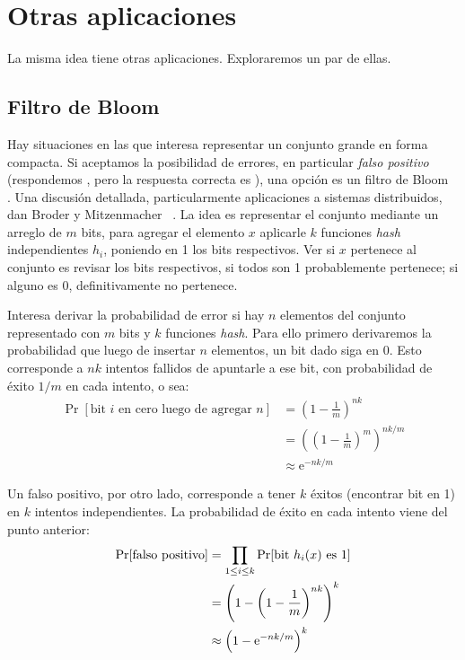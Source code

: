 
\section{Otras aplicaciones}
\label{sec:otras-aplicaciones}

  La misma idea tiene otras aplicaciones.
  Exploraremos un par de ellas.

\subsection{Filtro de Bloom}
\label{sec:filtro-de-bloom}

  Hay situaciones en las que interesa
  representar un conjunto grande en forma compacta.
  Si aceptamos la posibilidad de errores,
  en particular \emph{falso positivo}
  (respondemos ,
   pero la respuesta correcta es ),
  una opción es un filtro de Bloom~%
   \cite{bloom70:_space_time_trade_hash_codin_allow_error}.
  Una discusión detallada,
  particularmente aplicaciones a sistemas distribuidos,
  dan Broder y Mitzenmacher~%
    \cite{broder04:_network_appl_bloom_filters}.
  La idea es representar el conjunto mediante un arreglo de \(m\) bits,
  para agregar el elemento \(x\)
  aplicarle \(k\) funciones \emph{\foreignlanguage{english}{hash}}
  independientes \(h_i\),
  poniendo en \num{1} los bits respectivos.
  Ver si \(x\) pertenece al conjunto es revisar los bits respectivos,
  si todos son \num{1}
  probablemente pertenece;
  si alguno es \num{0},
  definitivamente no pertenece.

  Interesa derivar la probabilidad de error si hay \(n\) elementos del conjunto
  representado con \(m\) bits
  y \(k\) funciones \emph{\foreignlanguage{english}{hash}}.
  Para ello primero derivaremos la probabilidad
  que luego de insertar \(n\) elementos,
  un bit dado siga en \num{0}.
  Esto corresponde a \(n k\) intentos fallidos de apuntarle a ese bit,
  con probabilidad de éxito \(1 / m\) en cada intento,
  o sea:
  \begin{align*}
    \Pr[\text{bit \(i\) en cero luego de agregar \(n\)}]
      &=	   \left( 1 - \frac{1}{m} \right)^{n k} \\
      &=	   \left( \left( 1 - \frac{1}{m} \right)^m \right)^{n k / m} \\
      &\approx \mathrm{e}^{- n k / m}
  \end{align*}

  Un falso positivo,
  por otro lado,
  corresponde a tener \(k\) éxitos
  (encontrar bit en \num{1})
  en \(k\) intentos independientes.
  La probabilidad de éxito en cada intento viene del punto anterior:
  \begin{align*}
    \Pr[\text{falso positivo}]
      &=	    \prod_{1 \le i \le k}
                \Pr[\text{bit \(h_i(x)\) es \num{1}}] \\
      &=	    \left(
                  1 - \left( 1 - \frac{1}{m} \right)^{n k}
                \right)^k \\
      &\approx \left( 1 - \mathrm{e}^{-n k / m} \right)^k
  \end{align*}

